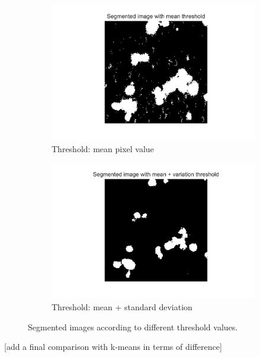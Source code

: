 \begin{figure}[h]
    \centering
    \begin{subfigure}[h!]{0.4\textwidth}
        \includegraphics[width=\textwidth]{dissertation/figures/mean_threshold_cell.jpg}
        \caption{Threshold: mean pixel value}
        \label{fig:thresholdmean}
    \end{subfigure}
    \begin{subfigure}[h!]{0.4\textwidth}
        \includegraphics[width=\textwidth]{dissertation/figures/mean_std_threshold_cell.jpg}
        \caption{Threshold: mean + standard deviation}
        \label{fig:thresholdstd}
    \end{subfigure}
    \caption{Segmented images according to different threshold values.}
\end{figure}

[add a final comparison with k-means in terms of difference]

